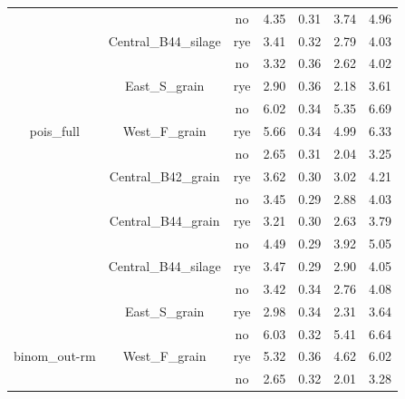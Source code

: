 \documentclass[
]{article}
\begin{document}
\begin{table}[H]
\begin{tabular}[t]{ccccccc}
\rowcolor{gray!6}   &  & no & 4.35 & 0.31 & 3.74 & 4.96\\

 & \multirow{-2}{*}{\centering\arraybackslash Central\_B44\_silage} & rye & 3.41 & 0.32 & 2.79 & 4.03\\

\rowcolor{gray!6}   &  & no & 3.32 & 0.36 & 2.62 & 4.02\\

 & \multirow{-2}{*}{\centering\arraybackslash East\_S\_grain} & rye & 2.90 & 0.36 & 2.18 & 3.61\\

\rowcolor{gray!6}   &  & no & 6.02 & 0.34 & 5.35 & 6.69\\

\multirow{-10}{*}{\centering\arraybackslash pois\_full} & \multirow{-2}{*}{\centering\arraybackslash West\_F\_grain} & rye & 5.66 & 0.34 & 4.99 & 6.33\\
\cmidrule{1-7}
\rowcolor{gray!6}   &  & no & 2.65 & 0.31 & 2.04 & 3.25\\

 & \multirow{-2}{*}{\centering\arraybackslash Central\_B42\_grain} & rye & 3.62 & 0.30 & 3.02 & 4.21\\

\rowcolor{gray!6}   &  & no & 3.45 & 0.29 & 2.88 & 4.03\\

 & \multirow{-2}{*}{\centering\arraybackslash Central\_B44\_grain} & rye & 3.21 & 0.30 & 2.63 & 3.79\\

\rowcolor{gray!6}   &  & no & 4.49 & 0.29 & 3.92 & 5.05\\

 & \multirow{-2}{*}{\centering\arraybackslash Central\_B44\_silage} & rye & 3.47 & 0.29 & 2.90 & 4.05\\

\rowcolor{gray!6}   &  & no & 3.42 & 0.34 & 2.76 & 4.08\\

 & \multirow{-2}{*}{\centering\arraybackslash East\_S\_grain} & rye & 2.98 & 0.34 & 2.31 & 3.64\\

\rowcolor{gray!6}   &  & no & 6.03 & 0.32 & 5.41 & 6.64\\

\multirow{-10}{*}{\centering\arraybackslash binom\_out-rm} & \multirow{-2}{*}{\centering\arraybackslash West\_F\_grain} & rye & 5.32 & 0.36 & 4.62 & 6.02\\
\cmidrule{1-7}
\rowcolor{gray!6}   &  & no & 2.65 & 0.32 & 2.01 & 3.28\\


\end{tabular}
\end{table}
\end{document}
